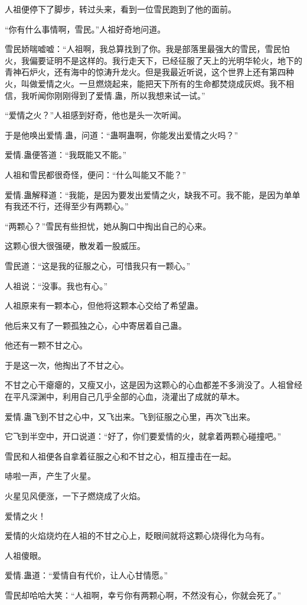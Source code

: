 \begin{this_body}
人祖便停下了脚步，转过头来，看到一位雪民跑到了他的面前。

“你有什么事情啊，雪民。”人祖好奇地问道。

雪民娇喘嘘嘘：“人祖啊，我总算找到了你。我是部落里最强大的雪民，雪民怕火，我偏要证明不是这样的。我行走天下，已经征服了天上的光明华轮火，地下的青神石炉火，还有海中的惊涛升龙火。但是我最近听说，这个世界上还有第四种火，叫做爱情之火。一旦燃烧起来，能把天下所有的生命都焚烧成灰烬。我不相信，我听闻你刚刚得到了爱情.蛊，所以我想来试一试。”

“爱情之火？”人祖感到好奇，他也是头一次听闻。

于是他唤出爱情.蛊，问道：“蛊啊蛊啊，你能发出爱情之火吗？”

爱情.蛊便答道：“我既能又不能。”

人祖和雪民都很奇怪，便问：“什么叫能又不能？”

爱情.蛊解释道：“我能，是因为要发出爱情之火，缺我不可。我不能，是因为单单有我还不行，还得至少有两颗心。”

“两颗心？”雪民有些担忧，她从胸口中掏出自己的心来。

这颗心很大很强硬，散发着一股威压。

雪民道：“这是我的征服之心，可惜我只有一颗心。”

人祖说：“没事。我也有心。”

人祖原来有一颗本心，但他将这颗本心交给了希望蛊。

他后来又有了一颗孤独之心，心中寄居着自己蛊。

他还有一颗不甘之心。

于是这一次，他掏出了不甘之心。

不甘之心干瘪瘪的，又瘦又小，这是因为这颗心的心血都差不多淌没了。人祖曾经在平凡深渊中，利用自己几乎全部的心血，浇灌出了成就的草木。

爱情.蛊飞到不甘之心中，又飞出来。飞到征服之心里，再次飞出来。

它飞到半空中，开口说道：“好了，你们要爱情的火，就拿着两颗心碰撞吧。”

雪民和人祖便各自拿着征服之心和不甘之心，相互撞击在一起。

哧啦一声，产生了火星。

火星见风便涨，一下子燃烧成了火焰。

爱情之火！

爱情的火焰烧灼在人祖的不甘之心上，眨眼间就将这颗心烧得化为乌有。

人祖傻眼。

爱情.蛊道：“爱情自有代价，让人心甘情愿。”

雪民却哈哈大笑：“人祖啊，幸亏你有两颗心啊，不然没有心，你就会死了。”


\end{this_body}
